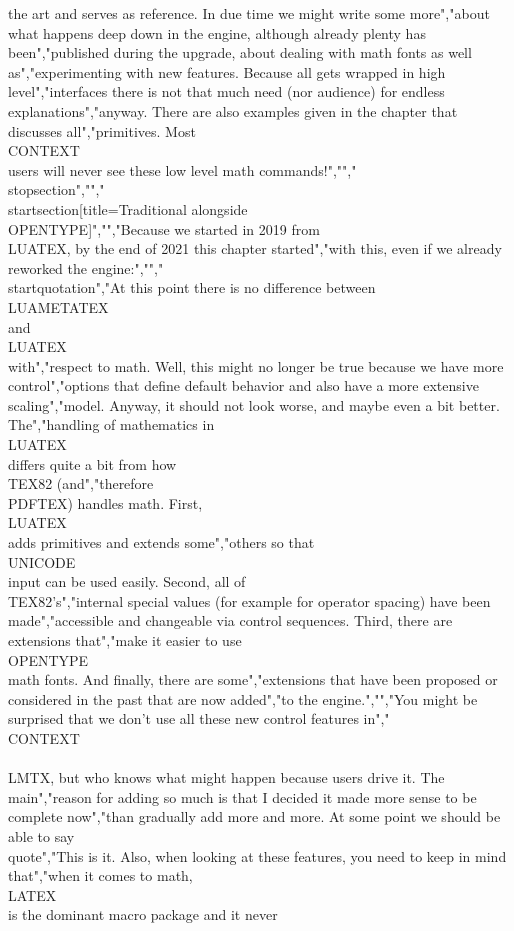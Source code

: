the art and serves as reference. In due time we might write some more","about what happens deep down in the engine, although already plenty has been","published during the upgrade, about dealing with math fonts as well as","experimenting with new features. Because all gets wrapped in high level","interfaces there is not that much need (nor audience) for endless explanations","anyway. There are also examples given in the chapter that discusses all","primitives. Most \\CONTEXT\\ users will never see these low level math commands!","","\\stopsection","","\\startsection[title={Traditional alongside \\OPENTYPE}]","","Because we started in 2019 from \\LUATEX, by the end of 2021 this chapter started","with this, even if we already reworked the engine:","","\\startquotation","At this point there is no difference between \\LUAMETATEX\\ and \\LUATEX\\ with","respect to math. Well, this might no longer be true because we have more control","options that define default behavior and also have a more extensive scaling","model. Anyway, it should not look worse, and maybe even a bit better. The","handling of mathematics in \\LUATEX\\ differs quite a bit from how \\TEX82 (and","therefore \\PDFTEX) handles math. First, \\LUATEX\\ adds primitives and extends some","others so that \\UNICODE\\ input can be used easily. Second, all of \\TEX82's","internal special values (for example for operator spacing) have been made","accessible and changeable via control sequences. Third, there are extensions that","make it easier to use \\OPENTYPE\\ math fonts. And finally, there are some","extensions that have been proposed or considered in the past that are now added","to the engine.","","You might be surprised that we don't use all these new control features in","\\CONTEXT\\ \\LMTX, but who knows what might happen because users drive it. The main","reason for adding so much is that I decided it made more sense to be complete now","than gradually add more and more. At some point we should be able to say \\quote","{This is it}. Also, when looking at these features, you need to keep in mind that","when it comes to math, \\LATEX\\ is the dominant macro package and it never 